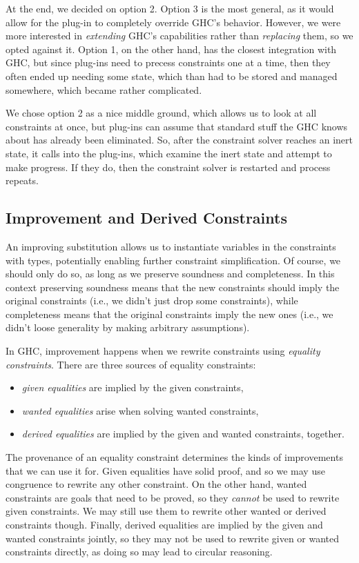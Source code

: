 \documentclass{sigplanconf}
\begin{document}
At the end, we decided on option 2.  Option 3 is the most general, as it
would allow for the plug-in to completely override GHC's behavior.  However,
we were more interested in {\em extending} GHC's capabilities rather than
{\em replacing} them, so we opted against it.  Option 1, on the other hand,
has the closest integration with GHC, but since plug-ins need to precess
constraints one at a time, then they often ended up needing some state,
which than had to be stored and managed somewhere, which became rather
complicated.

We chose option 2 as a nice middle ground, which allows us to look at
all constraints at once, but plug-ins can assume that standard stuff
the GHC knows about has already been eliminated. So, after the constraint
solver reaches an inert state, it calls into the plug-ins, which examine
the inert state and attempt to make progress.  If they do, then the
constraint solver is restarted and process repeats.

\subsection{Improvement and Derived Constraints}
An improving substitution \cite{improvement} allows us to instantiate variables
in the constraints with types, potentially enabling further constraint
simplification.  Of course, we should only do so, as long
as we preserve soundness and completeness.  In this context preserving
soundness means that the new constraints should imply the original
constraints (i.e., we didn't just drop some constraints),
while completeness means that the original constraints imply the new ones
(i.e., we didn't loose generality by making arbitrary assumptions).

In GHC, improvement happens when we rewrite constraints using
{\em equality constraints}. There are three sources of equality constraints:
\begin{itemize}
\item {\em given equalities} are implied by the given constraints,
\item {\em wanted equalities} arise when solving wanted constraints,
\item {\em derived equalities} are implied by the given and wanted constraints,
together.
\end{itemize}

The provenance of an equality constraint determines the kinds of
improvements that we can use it for.  Given equalities have solid proof,
and so we may use congruence to rewrite any other constraint.
On the other hand, wanted constraints are goals that need to be proved,
so they {\em cannot} be used to rewrite given constraints.  We may still
use them to rewrite other wanted or derived constraints though.
Finally, derived equalities are implied by the given and wanted constraints
jointly, so they may not be used to rewrite given or wanted constraints
directly, as doing so may lead to circular reasoning.
\end{document}
